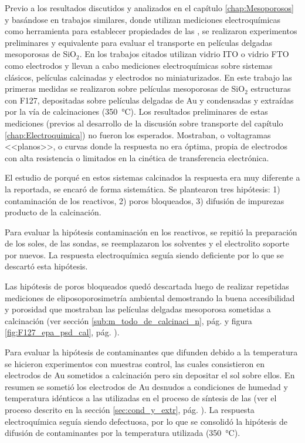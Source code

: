 {{  			Previo a los resultados discutidos y analizados en el capítulo \ref{chap:Mesoporosos} y basándose en trabajos similares\cite{Otal2006,Calvo2009,Fattakhova-Rohlfing2007,Rohlfing2005}, donde utilizan mediciones electroquímicas como herramienta para establecer propiedades de las \pdm, se realizaron experimentos preliminares y equivalente para evaluar el transporte en películas delgadas mesoporosas de SiO$_2$. En los trabajos citados utilizan vidrio ITO o vidrio FTO como electrodos y llevan a cabo mediciones electroquímicas sobre sistemas clásicos, películas calcinadas y electrodos no miniaturizados. En este trabajo las primeras medidas se realizaron sobre películas mesoporosas de SiO$_2$ estructuras con F127, depositadas sobre películas delgadas de Au y condensadas y extraídas por la vía de calcinaciones (\SI{350}{\celsius}). Los resultados preliminares de estas mediciones (previos al desarrollo de la discusión sobre transporte del capítulo \ref{chap:Electroquimica}) no fueron los esperados. Mostraban, o voltagramas <<planos>>, o curvas donde la respuesta no era óptima, propia de electrodos con alta resistencia o limitados en la cinética de transferencia electrónica.

  			El estudio de porqué en estos sistemas calcinados la respuesta era muy diferente a la reportada, se encaró de forma sistemática. Se plantearon tres hipótesis: 1) contaminación de los reactivos, 2) poros bloqueados, 3) difusión de impurezas producto de la calcinación.

  			Para evaluar la hipótesis contaminación en los reactivos, se repitió la preparación de los soles, de las sondas, se reemplazaron los solventes y el electrolito soporte por nuevos. La respuesta electroquímica seguía siendo deficiente por lo que se descartó esta hipótesis. 

  			Las hipótesis de poros bloqueados quedó descartada luego de realizar repetidas mediciones de eliposoporosimetría ambiental demostrando la buena accesibilidad y porosidad que mostraban las películas delgadas mesoporosa sometidas a  calcinación (ver sección \ref{sub:m_todo_de_calcinaci_n}, pág. \pageref{sub:m_todo_de_calcinaci_n} y figura \ref{fig:F127_epa_psd_cal}, pág. \pageref{fig:F127_epa_psd_cal}).

  			Para evaluar la hipótesis de contaminantes que difunden debido a la temperatura se hicieron experimentos con muestras control, las cuales consistieron en electrodos de Au sometidos a calcinación pero sin depositar el sol sobre ellos. En resumen se sometió los electrodos de Au desnudos a condiciones de humedad y temperatura idénticos a las utilizadas en el proceso de síntesis de las \pdm\space (ver el proceso descrito en la sección \ref{sec:cond_y_extr}, pág. \pageref{sec:cond_y_extr}). La respuesta electroquímica seguía siendo defectuosa, por lo que se consolidó la hipótesis de difusión de contaminantes por la temperatura utilizada (\SI{350}{\celsius}). 

}}

